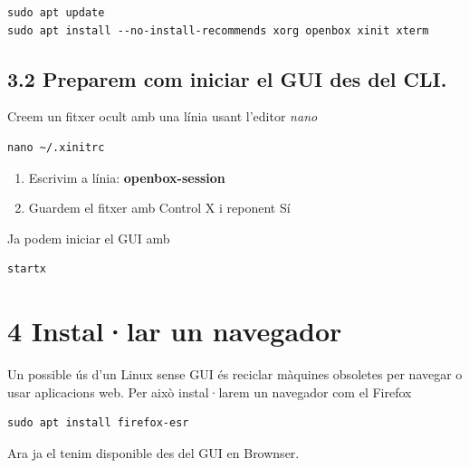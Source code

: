 \documentclass[
  catalan,
  a4paper,
]{article}
\providecommand{\tightlist}{%
  \setlength{\itemsep}{0pt}\setlength{\parskip}{0pt}}
\begin{document}
\begin{verbatim}
sudo apt update
sudo apt install --no-install-recommends xorg openbox xinit xterm
\end{verbatim}

\subsection{3.2 Preparem com iniciar el GUI des del
CLI.}\label{preparem-com-iniciar-el-gui-des-del-cli.}

Creem un fitxer ocult amb una línia usant l'editor \emph{nano}

\begin{verbatim}
nano ~/.xinitrc
\end{verbatim}

\begin{enumerate}
\def\labelenumi{\arabic{enumi}.}
\tightlist
\item
  Escrivim a línia: \textbf{openbox-session}
\item
  Guardem el fitxer amb Control X i reponent Sí
\end{enumerate}

Ja podem iniciar el GUI amb

\begin{verbatim}
startx
\end{verbatim}

\section{4 Instal·lar un navegador}\label{installar-un-navegador}

Un possible ús d'un Linux sense GUI és reciclar màquines obsoletes per
navegar o usar aplicacions web. Per això instal·larem un navegador com
el Firefox

\begin{verbatim}
sudo apt install firefox-esr
\end{verbatim}

Ara ja el tenim disponible des del GUI en Brownser.
\end{document}
